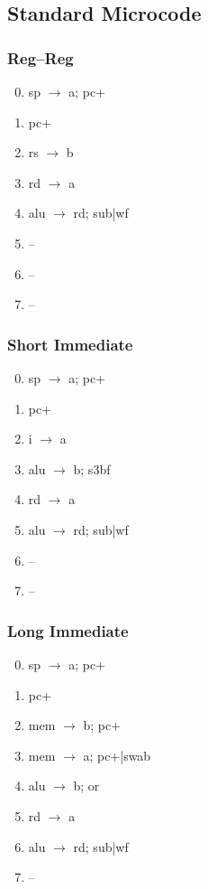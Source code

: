 \documentclass[11pt]{book}
\begin{document}
\subsection*{Standard Microcode}
\begin{multicols}{3}\ttfamily\selectfont\small
  \subsubsection*{Reg--Reg}
  \begin{enumerate}\setcounter{enumi}{-1}
  \item sp \(\rightarrow\) a; pc+
  \item pc+
  \item rs \(\rightarrow\) b
  \item rd \(\rightarrow\) a
  \item alu \(\rightarrow\) rd; sub|wf
  \item --
  \item --
  \item --
  \end{enumerate}
  \columnbreak
  \subsubsection*{Short Immediate}
  \begin{enumerate}\setcounter{enumi}{-1}
  \item sp \(\rightarrow\) a; pc+
  \item pc+
  \item i \(\rightarrow\) a
  \item alu \(\rightarrow\) b; s3bf
  \item rd \(\rightarrow\) a
  \item alu \(\rightarrow\) rd; sub|wf
  \item --
  \item --
  \end{enumerate}
  \columnbreak
  \subsubsection*{Long Immediate}
  \begin{enumerate}\setcounter{enumi}{-1}
  \item sp \(\rightarrow\) a; pc+
  \item pc+
  \item mem \(\rightarrow\) b; pc+
  \item mem \(\rightarrow\) a; pc+|swab
  \item alu \(\rightarrow\) b; or
  \item rd \(\rightarrow\) a
  \item alu \(\rightarrow\) rd; sub|wf
  \item --
  \end{enumerate}
\end{multicols}
\end{document}

